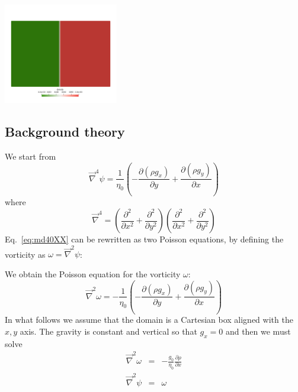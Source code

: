 \begin{center}
\includegraphics[width=5cm]{images/fdm/project/rho2}
\end{center}

\subsection*{Background theory}

We start from 
\begin{equation}
\vec\nabla^4 \psi = \frac{1}{\eta_0} \left( -\frac{\partial (\rho g_x)}{\partial y}
+\frac{\partial (\rho g_y)}{\partial x} \right)
\label{eq:md40XX}
\end{equation}
where
\[
\vec\nabla^4 = 
\left( 
\frac{\partial^2 }{\partial x^2} + \frac{\partial^2 }{\partial y^2} 
\right) 
\left( 
\frac{\partial^2 }{\partial x^2} + \frac{\partial^2 }{\partial y^2} 
\right) 
\]
Eq.~\eqref{eq:md40XX} can be rewritten as two Poisson equations, by 
defining the vorticity as $\omega = \vec\nabla^2 \psi$:

We obtain 
the Poisson equation for the vorticity $\omega$:
\begin{equation}
\vec\nabla^2 \omega = -\frac{1}{\eta_0} \left( -\frac{\partial (\rho g_x)}{\partial y}
+\frac{\partial (\rho g_y)}{\partial x} \right)
\end{equation}
In what follows we assume that the domain is a Cartesian box aligned 
with the $x,y$ axis. The gravity is constant and vertical so that $g_x=0$ and 
then we must solve 
\begin{eqnarray}
\vec\nabla^2 \omega &=& -\frac{g_0}{\eta_0}  \frac{\partial \rho}{\partial x} \label{eq:poiss1} \\
\vec\nabla^2 \psi &=& \omega  \label{eq:poiss2} 
\end{eqnarray}


